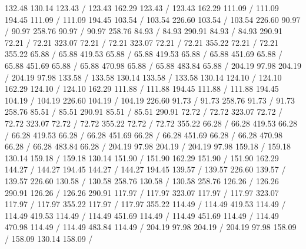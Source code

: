 { 132.48 130.14 123.43 /
 123.43 162.29 123.43 /
 123.43 162.29 111.09 /
 111.09 194.45 111.09 /
 111.09 194.45 103.54 /
 103.54 226.60 103.54 /
 103.54 226.60 90.97 /
 90.97 258.76 90.97 /
 90.97 258.76 84.93 /
 84.93 290.91 84.93 /
 84.93 290.91 72.21 /
 72.21 323.07 72.21 /
 72.21 323.07 72.21 /
 72.21 355.22 72.21 /
 72.21 355.22 65.88 /
 65.88 419.53 65.88 /
 65.88 419.53 65.88 /
 65.88 451.69 65.88 /
 65.88 451.69 65.88 /
 65.88 470.98 65.88 /
 65.88 483.84 65.88 /
\setdashpattern <1pt, 3pt>
 204.19 97.98 204.19 /
 204.19 97.98 133.58 /
 133.58 130.14 133.58 /
 133.58 130.14 124.10 /
 124.10 162.29 124.10 /
 124.10 162.29 111.88 /
 111.88 194.45 111.88 /
 111.88 194.45 104.19 /
 104.19 226.60 104.19 /
 104.19 226.60 91.73 /
 91.73 258.76 91.73 /
 91.73 258.76 85.51 /
 85.51 290.91 85.51 /
 85.51 290.91 72.72 /
 72.72 323.07 72.72 /
 72.72 323.07 72.72 /
 72.72 355.22 72.72 /
 72.72 355.22 66.28 /
 66.28 419.53 66.28 /
 66.28 419.53 66.28 /
 66.28 451.69 66.28 /
 66.28 451.69 66.28 /
 66.28 470.98 66.28 /
 66.28 483.84 66.28 /
\setdashpattern <4pt, 4pt>
 204.19 97.98 204.19 /
 204.19 97.98 159.18 /
 159.18 130.14 159.18 /
 159.18 130.14 151.90 /
 151.90 162.29 151.90 /
 151.90 162.29 144.27 /
 144.27 194.45 144.27 /
 144.27 194.45 139.57 /
 139.57 226.60 139.57 /
 139.57 226.60 130.58 /
 130.58 258.76 130.58 /
 130.58 258.76 126.26 /
 126.26 290.91 126.26 /
 126.26 290.91 117.97 /
 117.97 323.07 117.97 /
 117.97 323.07 117.97 /
 117.97 355.22 117.97 /
 117.97 355.22 114.49 /
 114.49 419.53 114.49 /
 114.49 419.53 114.49 /
 114.49 451.69 114.49 /
 114.49 451.69 114.49 /
 114.49 470.98 114.49 /
 114.49 483.84 114.49 /
\setdashpattern <1pt, 3pt>
 204.19 97.98 204.19 /
 204.19 97.98 158.09 /
 158.09 130.14 158.09 /
}
